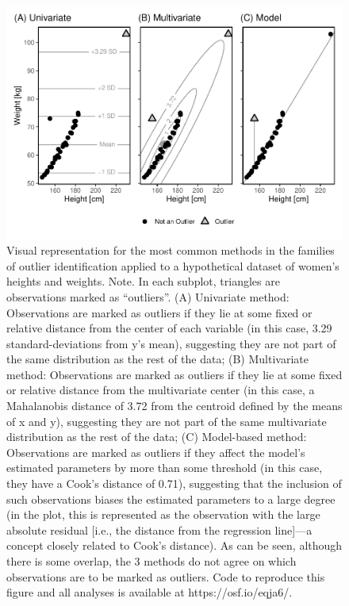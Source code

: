 \documentclass[sn-basic, lineno,pdflatex]{sn-jnl}
\begin{document}
\begin{figure}
\includegraphics[width=1\linewidth]{paper_files/figure-latex/fig1-1} \caption{Visual representation for the most common methods in the families of outlier identification applied to a hypothetical dataset of women’s heights and weights. Note. In each subplot, triangles are observations marked as “outliers”. (A) Univariate method: Observations are marked as outliers if they lie at some fixed or relative distance from the center of each variable (in this case, 3.29 standard-deviations from y’s mean), suggesting they are not part of the same distribution as the rest of the data; (B) Multivariate method: Observations are marked as outliers if they lie at some fixed or relative distance from the multivariate center (in this case, a Mahalanobis distance of 3.72 from the centroid defined by the means of x and y), suggesting they are not part of the same multivariate distribution as the rest of the data; (C) Model-based method: Observations are marked as outliers if they affect the model’s estimated parameters by more than some threshold (in this case, they have a Cook’s distance of 0.71), suggesting that the inclusion of such observations biases the estimated parameters to a large degree (in the plot, this is represented as the observation with the large absolute residual [i.e., the distance from the regression line]—a concept closely related to Cook’s distance). As can be seen, although there is some overlap, the 3 methods do not agree on which observations are to be marked as outliers. Code to reproduce this figure and all analyses is available at https://osf.io/eqja6/.}\label{fig:fig1}
\end{figure}
\end{document}
